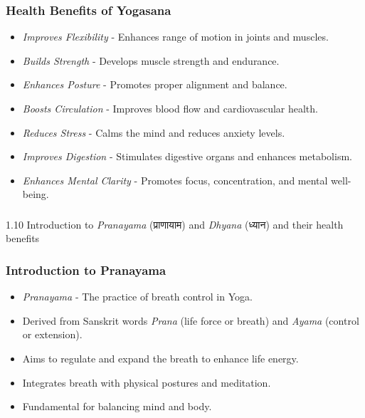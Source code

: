 \begin{frame}[fragile]\frametitle{Health Benefits of Yogasana}

      \begin{itemize}
		\item \textit{Improves Flexibility} - Enhances range of motion in joints and muscles.
		\item \textit{Builds Strength} - Develops muscle strength and endurance.
		\item \textit{Enhances Posture} - Promotes proper alignment and balance.
		\item \textit{Boosts Circulation} - Improves blood flow and cardiovascular health.
		\item \textit{Reduces Stress} - Calms the mind and reduces anxiety levels.
		\item \textit{Improves Digestion} - Stimulates digestive organs and enhances metabolism.
		\item \textit{Enhances Mental Clarity} - Promotes focus, concentration, and mental well-being.
	  \end{itemize}

\end{frame}



\begin{frame}[fragile]\frametitle{}
\begin{center}
{\Large 1.10 Introduction to \textit{Pranayama} (प्राणायाम) and \textit{Dhyana} (ध्यान) and their health benefits}
\end{center}
\end{frame}


\begin{frame}[fragile]\frametitle{Introduction to Pranayama}

      \begin{itemize}
		\item \textit{Pranayama} - The practice of breath control in Yoga.
		\item Derived from Sanskrit words \textit{Prana} (life force or breath) and \textit{Ayama} (control or extension).
		\item Aims to regulate and expand the breath to enhance life energy.
		\item Integrates breath with physical postures and meditation.
		\item Fundamental for balancing mind and body.
	  \end{itemize}

\end{frame}

